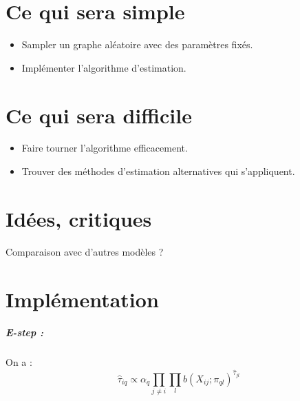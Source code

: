 \documentclass[12pt]{article}
\begin{document}
\section{Ce qui sera simple}

\begin{itemize}
    \item Sampler un graphe aléatoire avec des paramètres fixés.
    \item Implémenter l'algorithme d'estimation.
\end{itemize}

\section{Ce qui sera difficile}

\begin{itemize}
    \item Faire tourner l'algorithme efficacement.
    \item Trouver des méthodes d'estimation alternatives qui s'appliquent.
\end{itemize}

\section{Idées, critiques}

Comparaison avec d'autres modèles ?

\section{Implémentation}

\subparagraph*{E-step :}

On a :
\begin{equation}
    \hat{\tau}_{iq} \propto \alpha_q\prod_{j\neq i}\prod_lb(X_{ij};\pi_{ql})^{\hat{\tau}_{jl}}
\end{equation}
\end{document}
